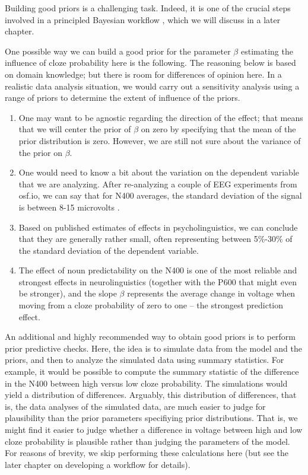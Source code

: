 \documentclass[12pt,]{krantz}
\providecommand{\tightlist}{%
  \setlength{\itemsep}{0pt}\setlength{\parskip}{0pt}}
\theoremstyle{definition}
\theoremstyle{definition}
\theoremstyle{definition}
\theoremstyle{remark}
\begin{document}
Building good priors is a challenging task. Indeed, it is one of the
crucial steps involved in a principled Bayesian workflow
\citep{schad2020toward}, which we will discuss in a later chapter.

One possible way we can build a good prior for the parameter \(\beta\)
estimating the influence of cloze probability here is the following. The
reasoning below is based on domain knowledge; but there is room for
differences of opinion here. In a realistic data analysis situation, we
would carry out a sensitivity analysis using a range of priors to
determine the extent of influence of the priors.

\begin{enumerate}
\def\labelenumi{\arabic{enumi}.}
\tightlist
\item
  One may want to be agnostic regarding the direction of the effect;
  that means that we will center the prior of \(\beta\) on zero by
  specifying that the mean of the prior distribution is zero. However,
  we are still not sure about the variance of the prior on \(\beta\).
\item
  One would need to know a bit about the variation on the dependent
  variable that we are analyzing. After re-analyzing a couple of EEG
  experiments from osf.io, we can say that for N400 averages, the
  standard deviation of the signal is between 8-15 microvolts
  \citep{nicenboim2020words}.
\item
  Based on published estimates of effects in psycholinguistics, we can
  conclude that they are generally rather small, often representing
  between 5\%-30\% of the standard deviation of the dependent variable.
\item
  The effect of noun predictability on the N400 is one of the most
  reliable and strongest effects in neurolinguistics (together with the
  P600 that might even be stronger), and the slope \(\beta\) represents
  the average change in voltage when moving from a cloze probability of
  zero to one -- the strongest prediction effect.
\end{enumerate}

An additional and highly recommended way to obtain good priors
\citep[also see the chapter on a principled Bayesian
workflow]{schad2020toward} is to perform prior predictive checks. Here,
the idea is to simulate data from the model and the priors, and then to
analyze the simulated data using summary statistics. For example, it
would be possible to compute the summary statistic of the difference in
the N400 between high versus low cloze probability. The simulations
would yield a distribution of differences. Arguably, this distribution
of differences, that is, the data analyses of the simulated data, are
much easier to judge for plausibility than the prior parameters
specifiying prior distributions. That is, we might find it easier to
judge whether a difference in voltage between high and low cloze
probability is plausible rather than judging the parameters of the
model. For reasons of brevity, we skip performing these calculations
here (but see the later chapter on developing a workflow for details).
\end{document}
